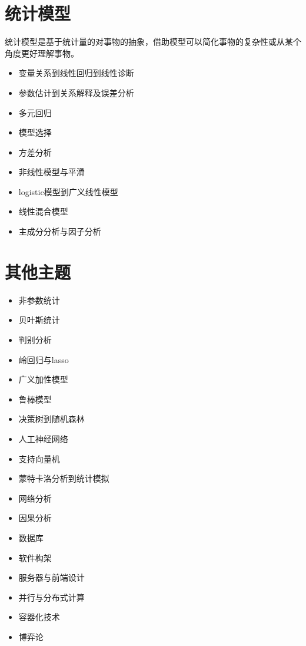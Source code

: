 \documentclass[
]{book}
\providecommand{\tightlist}{%
  \setlength{\itemsep}{0pt}\setlength{\parskip}{0pt}}
\begin{document}
\hypertarget{sm}{%
\section{统计模型}\label{sm}}

统计模型是基于统计量的对事物的抽象，借助模型可以简化事物的复杂性或从某个角度更好理解事物。

\begin{itemize}
\tightlist
\item
  变量关系到线性回归到线性诊断
\item
  参数估计到关系解释及误差分析
\item
  多元回归
\item
  模型选择
\item
  方差分析
\item
  非线性模型与平滑
\item
  logistic模型到广义线性模型
\item
  线性混合模型
\item
  主成分分析与因子分析
\end{itemize}

\hypertarget{ux5176ux4ed6ux4e3bux9898}{%
\section{其他主题}\label{ux5176ux4ed6ux4e3bux9898}}

\begin{itemize}
\tightlist
\item
  非参数统计
\item
  贝叶斯统计
\item
  判别分析
\item
  岭回归与lasso
\item
  广义加性模型
\item
  鲁棒模型
\item
  决策树到随机森林
\item
  人工神经网络
\item
  支持向量机
\item
  蒙特卡洛分析到统计模拟
\item
  网络分析
\item
  因果分析
\item
  数据库
\item
  软件构架
\item
  服务器与前端设计
\item
  并行与分布式计算
\item
  容器化技术
\item
  博弈论
\end{itemize}
\end{document}
